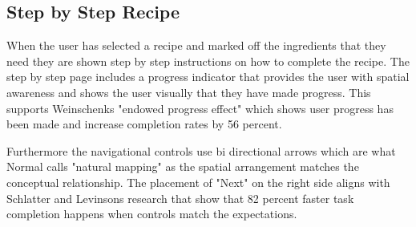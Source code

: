 \documentclass[]{project_final}
\begin{document}
\subsection{Step by Step Recipe}
When the user has selected a recipe and marked off the ingredients that they need they are shown step by step instructions on how to complete the recipe.
The step by step page includes a progress indicator that provides the user with spatial awareness and shows the user visually that they have made progress. This supports Weinschenks "endowed progress effect" which shows user progress has been made and increase completion rates by 56 percent.

Furthermore the navigational controls use bi directional arrows which are what Normal calls "natural mapping" as the spatial arrangement matches the conceptual relationship.
The placement of "Next" on the right side aligns with Schlatter and Levinsons research that show that 82 percent faster task completion happens when controls match the expectations.
\end{document}

